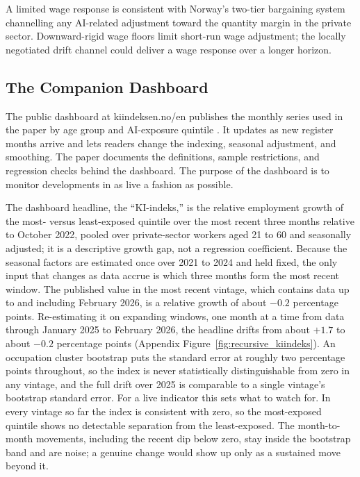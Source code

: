\documentclass[12pt]{article}
\begin{document}


A limited wage response is consistent with Norway's two-tier bargaining system \citep{bhuller2022} channelling any AI-related adjustment toward the quantity margin in the private sector. Downward-rigid wage floors limit short-run wage adjustment; the locally negotiated drift channel could deliver a wage response over a longer horizon. 

\subsection{The Companion Dashboard}\label{sec:discussion:dashboard}

The public dashboard at kiindeksen.no/en publishes the monthly series used in the paper by age group and AI-exposure quintile \citep{kiindeksen2026}. It updates as new register months arrive and lets readers change the indexing, seasonal adjustment, and smoothing. The paper documents the definitions, sample restrictions, and regression checks behind the dashboard. The purpose of the dashboard is to monitor developments in as live a fashion as possible.

The dashboard headline, the ``KI-indeks,'' is the relative employment growth of the most- versus least-exposed quintile over the most recent three months relative to October 2022, pooled over private-sector workers aged 21 to 60 and seasonally adjusted; it is a descriptive growth gap, not a regression coefficient. Because the seasonal factors are estimated once over 2021 to 2024 and held fixed, the only input that changes as data accrue is which three months form the most recent window. The published value in the most recent vintage, which contains data up to and including February 2026, is a relative growth of about $-0.2$ percentage points. Re-estimating it on expanding windows, one month at a time from data through January 2025 to February 2026, the headline drifts from about $+1.7$ to about $-0.2$ percentage points (Appendix Figure~\ref{fig:recursive_kiindeks}). An occupation cluster bootstrap puts the standard error at roughly two percentage points throughout, so the index is never statistically distinguishable from zero in any vintage, and the full drift over 2025 is comparable to a single vintage's bootstrap standard error. For a live indicator this sets what to watch for. In every vintage so far the index is consistent with zero, so the most-exposed quintile shows no detectable separation from the least-exposed. The month-to-month movements, including the recent dip below zero, stay inside the bootstrap band and are noise; a genuine change would show up only as a sustained move beyond it. 
\end{document}

